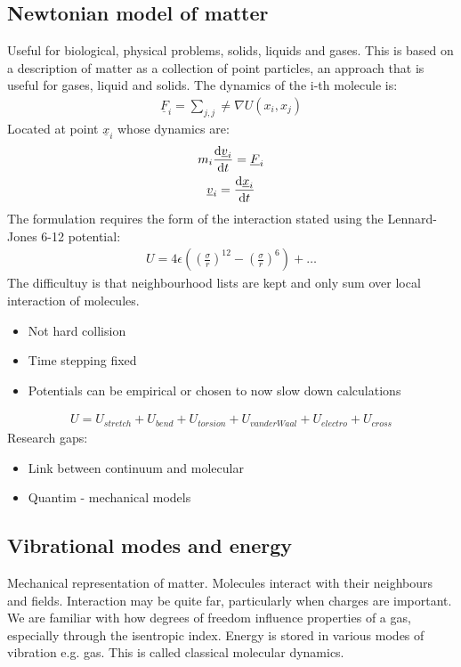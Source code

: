 \subsection{Newtonian model of matter}
Useful for biological, physical problems, solids, liquids and gases. This is based on a description of matter as a collection of point particles, an approach that is useful for gases, liquid and solids. The dynamics of the i-th molecule is:
\begin{gather}
	\underline{F}_i = \sum_{j,j} \neq \nabla U\left(x_i,x_j\right)
\end{gather}
Located at point $\underline{x}_i$ whose dynamics are:
\begin{gather}
	m_i \dfrac{\dif \underline{v}_i}{\dif t} = \underline{F}_i\\
	\underline{v}_i = \frac{\dif \underline{x}_i}{\dif t}
\end{gather}
The formulation requires the form of the interaction stated using the Lennard-Jones 6-12 potential:
\begin{gather}
	U = 4 \epsilon \left(\left(\frac{\sigma}{r}\right)^{12} - \left(\frac{\sigma}{r}\right)^6\right) + \dots
\end{gather}
The difficultuy is that neighbourhood lists are kept and only sum over local interaction of molecules.
\begin{itemize}
	\item Not hard collision
	\item Time stepping fixed
	\item Potentials can be empirical or chosen to now slow down calculations
\end{itemize}
\begin{gather}
	U = U_{stretch} + U_{bend} + U_{torsion} + U_{vanderWaal} + U_{electro} + U_{cross}
\end{gather}
Research gaps:
\begin{itemize}
	\item Link between continuum and molecular
	\item Quantim - mechanical models
\end{itemize}
\subsection{Vibrational modes and energy}
Mechanical representation of matter. Molecules interact with their neighbours and fields. Interaction may be quite far, particularly when charges are important. We are familiar with how degrees of freedom influence properties of a gas, especially through the isentropic index. Energy is stored in various modes of vibration e.g. gas. This is called classical molecular dynamics.
